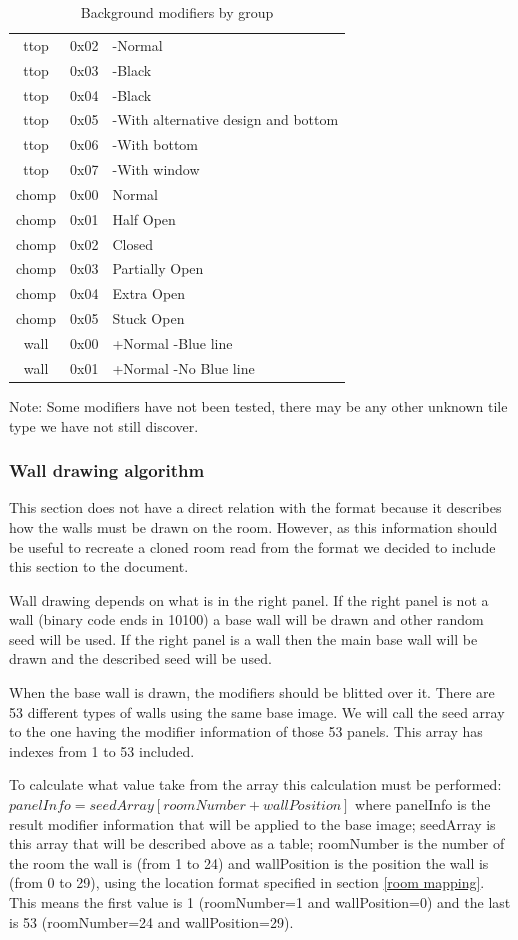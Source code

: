 \documentclass{article}
\begin{document}
\begin{table}
\begin{tabular}{ccl}
 ttop  & 0x02 & -Normal \\
 ttop  & 0x03 & -Black \\
 ttop  & 0x04 & -Black \\
 ttop  & 0x05 & -With alternative design and bottom \\
 ttop  & 0x06 & -With bottom \\
 ttop  & 0x07 & -With window \\
 chomp & 0x00 & Normal \\
 chomp & 0x01 & Half Open \\
 chomp & 0x02 & Closed \\
 chomp & 0x03 & Partially Open \\
 chomp & 0x04 & Extra Open \\
 chomp & 0x05 & Stuck Open \\
 wall  & 0x00 & +Normal  -Blue line \\
 wall  & 0x01 & +Normal  -No Blue line \\
\hline
\end{tabular}
\caption{Background modifiers by group}
\label{background modifiers}
\end{table}

 Note: Some modifiers have not been tested, there may be any other unknown
       tile type we have not still discover.


\subsubsection{Wall drawing algorithm} %
 This section does not have a direct relation with the format because it
 describes how the walls must be drawn on the room. However, as this
 information should be useful to recreate a cloned room read from the
 format we decided to include this section to the document.

 Wall drawing depends on what is in the right panel. If the right panel
 is not a wall (binary code ends in 10100) a base wall will be drawn and
 other random seed will be used. If the right panel is a wall then the main
 base wall will be drawn and the described seed will be used.

 When the base wall is drawn, the modifiers should be blitted over it.
 There are 53 different types of walls using the same base image.
 We will call the seed array to the one having the modifier information of
 those 53 panels. This array has indexes from 1 to 53 included.

 To calculate what value take from the array this calculation must be
 performed: $panelInfo=seedArray[roomNumber+wallPosition]$
 where panelInfo is the result modifier information that will be applied to
 the base image; seedArray is this array that will be described above as a
 table; roomNumber is the number of the room the wall is (from 1 to 24)
 and wallPosition is the position the wall is (from 0 to 29), using the
 location format specified in section \ref{room mapping}. This means the first value is
 1 (roomNumber=1 and wallPosition=0) and the last is 53 (roomNumber=24
 and wallPosition=29).
\end{document}
